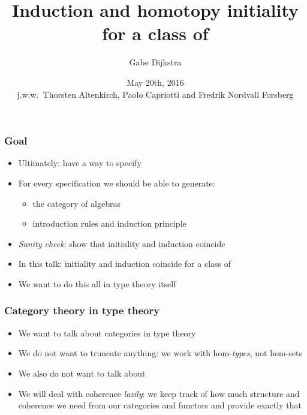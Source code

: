 \documentclass{beamer}
\title[Induction and initiality for \onehits]{Induction and homotopy initiality for a class of \onehits}
\author[Gabe Dijkstra]{
  Gabe Dijkstra
}
\institute[University of Nottingham]{
  University of Nottingham
 }
\date[May 20th, 2016]{May 20th, 2016 \\ \vspace{1cm} \small{j.w.w.\ Thorsten Altenkirch, Paolo Capriotti and Fredrik Nordvall Forsberg}}
\begin{document}
\begin{frame}
\maketitle
\end{frame}

\begin{frame}
  \frametitle{Goal}
  \begin{itemize}
  \item Ultimately: have a way to specify \hits
  \item For every specification we should be able to generate:
    \begin{itemize}
    \item the category of algebras
    \item introduction rules and induction principle
    \end{itemize}
  \item \emph{Sanity check}: show that initiality and induction coincide
  \item In this talk: initiality and induction coincide for a class of \onehits
  \item We want to do this all in type theory itself
  \end{itemize}
\end{frame}

\begin{frame}
  \frametitle{Category theory in type theory}
  \begin{itemize}
  \item We want to talk about categories in type theory
  \item We do not want to truncate anything: we work with
    hom-\emph{types}, not hom-sets
  \item We also do not want to talk about \omegacats
  \item We will deal with coherence \emph{lazily}: we keep track of
    how much structure and coherence we need from our categories and
    functors and provide exactly that
  \end{itemize}
\end{frame}
\end{document}
